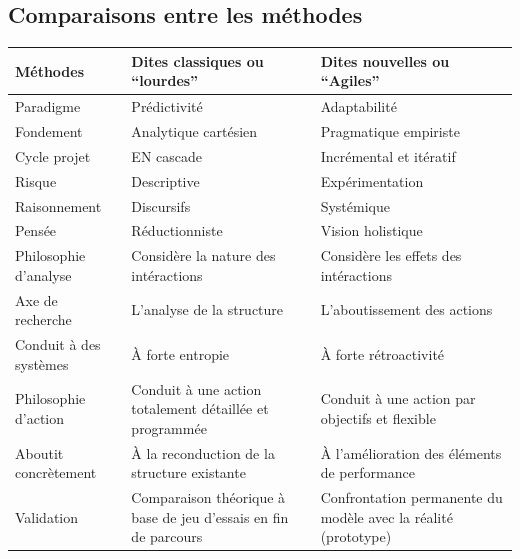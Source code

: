 		\subsection{Comparaisons entre les méthodes}
			\begin{center}
				\begin{tabular}{|p{3.5cm}||p{7cm}|p{7cm}|}
					\hline
					\textbf{Méthodes} & \textbf{Dites classiques ou ``lourdes''} & \textbf{Dites nouvelles ou ``Agiles''}\\
					\hline
					Paradigme & Prédictivité & Adaptabilité \\
					\hline
					Fondement & Analytique cartésien & Pragmatique empiriste \\
					\hline
					Cycle projet & EN cascade & Incrémental et itératif \\
					\hline
					Risque & Descriptive &Expérimentation \\
					\hline
					Raisonnement & Discursifs & Systémique \\
					\hline
					Pensée & Réductionniste & Vision holistique \\
					\hline
					Philosophie d'analyse & Considère la nature des intéractions & Considère les effets des intéractions \\
					\hline
					Axe de recherche & L'analyse de la structure & L'aboutissement des actions \\
					\hline
					Conduit à des systèmes & À forte entropie & À forte rétroactivité \\
					\hline
					Philosophie d'action & Conduit à une action totalement détaillée et programmée & Conduit à une action par objectifs et flexible\\
					\hline
					Aboutit concrètement & À la reconduction de la structure existante & À l'amélioration des éléments de performance\\
					\hline
					Validation & Comparaison théorique à base de jeu d'essais en fin de parcours & Confrontation permanente du modèle avec la réalité (prototype)\\
					\hline
				\end{tabular}
			\end{center}


